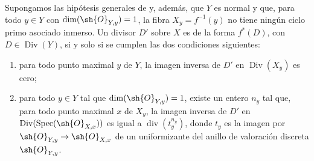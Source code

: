 \begin{corollary}[21.4.10]
\ifdefined\EGAIVSuppressErratumLabels\else\label{IV.21.4.10}\fi
Supongamos las hipótesis generales de {} y, además, que
$Y$ es normal y que, para todo $y\in Y$ con
$\dim(\sh{O}_{Y,y})=1$, la fibra $X_y=f^{-1}(y)$ no tiene ningún
ciclo primo asociado inmerso. Un divisor $D'$ sobre $X$ es de la forma $f^*(D)$,
con $D\in\operatorname{Div}(Y)$, si y solo si se cumplen las dos
condiciones siguientes:
\begin{enumerate}[label=\textup{\arabic*\textdegree}]
\item para todo punto maximal $y$ de $Y$, la imagen inversa de $D'$ en
$\operatorname{Div}(X_y)$ es cero;
\item para todo $y\in Y$ tal que $\dim(\sh{O}_{Y,y})=1$, existe un
entero $n_y$ tal que, para todo punto maximal $x$ de $X_y$, la
imagen inversa de $D'$ en
$\operatorname{Div}(\operatorname{Spec}(\sh{O}_{X,x}))$ es igual a
$\operatorname{div}(t_y^{n_y})$, donde $t_y$ es la imagen por
$\sh{O}_{Y,y}\to\sh{O}_{X,x}$ de un uniformizante del anillo de
valoración discreta $\sh{O}_{Y,y}$.
\end{enumerate}
\end{corollary}

